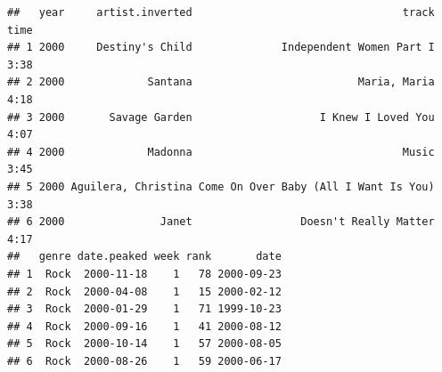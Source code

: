\documentclass[]{article}
\newenvironment{Shaded}{\begin{snugshade}}{\end{snugshade}}
\newcommand{\KeywordTok}[1]{\textcolor[rgb]{0.13,0.29,0.53}{\textbf{#1}}}
\newcommand{\DataTypeTok}[1]{\textcolor[rgb]{0.13,0.29,0.53}{#1}}
\newcommand{\DecValTok}[1]{\textcolor[rgb]{0.00,0.00,0.81}{#1}}
\newcommand{\StringTok}[1]{\textcolor[rgb]{0.31,0.60,0.02}{#1}}
\newcommand{\OtherTok}[1]{\textcolor[rgb]{0.56,0.35,0.01}{#1}}
\newcommand{\ControlFlowTok}[1]{\textcolor[rgb]{0.13,0.29,0.53}{\textbf{#1}}}
\newcommand{\OperatorTok}[1]{\textcolor[rgb]{0.81,0.36,0.00}{\textbf{#1}}}
\newcommand{\NormalTok}[1]{#1}
\begin{document}
\begin{Shaded}
\end{Shaded}

\begin{verbatim}
##   year     artist.inverted                                 track time
## 1 2000     Destiny's Child              Independent Women Part I 3:38
## 2 2000             Santana                          Maria, Maria 4:18
## 3 2000       Savage Garden                    I Knew I Loved You 4:07
## 4 2000             Madonna                                 Music 3:45
## 5 2000 Aguilera, Christina Come On Over Baby (All I Want Is You) 3:38
## 6 2000               Janet                 Doesn't Really Matter 4:17
##   genre date.peaked week rank       date
## 1  Rock  2000-11-18    1   78 2000-09-23
## 2  Rock  2000-04-08    1   15 2000-02-12
## 3  Rock  2000-01-29    1   71 1999-10-23
## 4  Rock  2000-09-16    1   41 2000-08-12
## 5  Rock  2000-10-14    1   57 2000-08-05
## 6  Rock  2000-08-26    1   59 2000-06-17
\end{verbatim}

\renewcommand\bcStyleTitre[1]{\large\textcolor{bbblack}{#1}}
\end{document}
